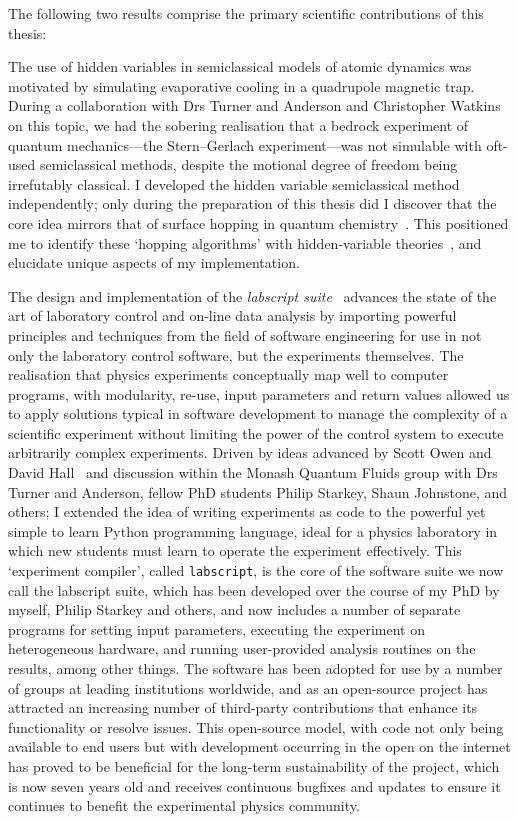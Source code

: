 The following two results comprise the primary scientific contributions of this thesis:

The use of hidden variables in semiclassical models of atomic dynamics was motivated by simulating evaporative cooling in a quadrupole magnetic trap. During a collaboration with Drs Turner and Anderson and Christopher Watkins on this topic, we had the sobering realisation that a bedrock experiment of quantum mechanics---the Stern--Gerlach experiment---was not simulable with oft-used semiclassical methods, despite the motional degree of freedom being irrefutably classical. I developed the hidden variable semiclassical method independently; only during the preparation of this thesis did I discover that the core idea mirrors that of surface hopping in quantum chemistry~\cite{doi:10.1063/1.459170}. This positioned me to identify these `hopping algorithms' with hidden-variable theories~\cite{PhysRevA.71.032325}, and elucidate unique aspects of my implementation.

The design and implementation of the \emph{labscript suite}~\cite{starkey_scripted_2013} advances the state of the art of laboratory control and on-line data analysis by importing powerful principles and techniques from the field of software engineering for use in not only the laboratory control software, but the experiments themselves. The realisation that physics experiments conceptually map well to computer programs, with modularity, re-use, input parameters and return values allowed us to apply solutions typical in software development to manage the complexity of a scientific experiment without limiting the power of the control system to execute arbitrarily complex experiments. Driven by ideas advanced by Scott Owen and David Hall~\cite{owen_fast_2003} and discussion within the Monash Quantum Fluids group with Drs Turner and Anderson, fellow PhD students Philip Starkey, Shaun Johnstone, and others; I extended the idea of writing experiments as code to the powerful yet simple to learn Python programming language, ideal for a physics laboratory in which new students must learn to operate the experiment effectively. This `experiment compiler', called \texttt{labscript}, is the core of the software suite we now call the labscript suite, which has been developed over the course of my PhD by myself, Philip Starkey and others, and now includes a number of separate programs for setting input parameters, executing the experiment on heterogeneous hardware, and running user-provided analysis routines on the results, among other things. The software has been adopted for use by a number of groups at leading institutions worldwide, and as an open-source project has attracted an increasing number of third-party contributions that enhance its functionality or resolve issues. This open-source model, with code not only being available to end users but with development occurring in the open on the internet has proved to be beneficial for the long-term sustainability of the project, which is now seven years old and receives continuous bugfixes and updates to ensure it continues to benefit the experimental physics community.

